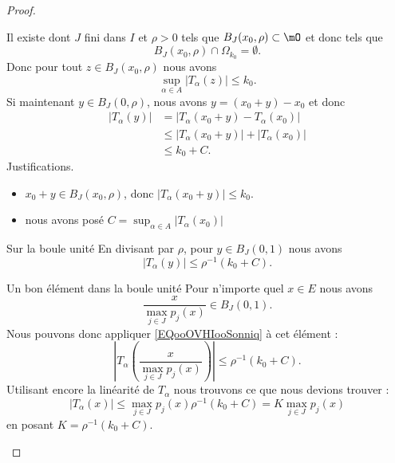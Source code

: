 \begin{proof}
\begin{subproof}
		Il existe dont \( J\) fini dans \( I\) et \( \rho>0\) tels que \( B_J(x_0,\rho)\subset \mO\) et donc tels que
		\begin{equation}
			B_J(x_0,\rho)\cap\Omega_{k_0}=\emptyset.
		\end{equation}
		Donc pour tout \( z\in B_J(x_0,\rho)\) nous avons
		\begin{equation}
			\sup_{\alpha\in A}\big| T_{\alpha}(z) \big|\leq k_0.
		\end{equation}
		Si maintenant \( y\in B_J(0,\rho)\), nous avons \( y=(x_0+y)-x_0\) et donc
		\begin{subequations}
			\begin{align}
				\big| T_{\alpha}(y) \big| & =\big| T_{\alpha}(x_0+y)-T_{\alpha}(x_0) \big|                 \\
				                          & \leq \big| T_{\alpha}(x_0+y) \big|+\big| T_{\alpha}(x_0) \big| \\
				                          & \leq k_0+C.
			\end{align}
		\end{subequations}
		Justifications.
		\begin{itemize}
			\item
			      \( x_0+y\in B_J(x_0,\rho)\), donc \( \big| T_{\alpha}(x_0+y) \big|\leq k_0\).
			\item
			      nous avons posé \( C=\sup_{\alpha\in A}\big| T_{\alpha}(x_0) \big|\)
		\end{itemize}
		\item[Sur la boule unité]
		En divisant par \( \rho\), pour \( y\in B_J(0,1)\) nous avons
		\begin{equation}        \label{EQooOVHIooSonniq}
			\big| T_{\alpha}(y) \big|\leq \rho^{-1}(k_0+C).
		\end{equation}
		\item[Un bon élément dans la boule unité]
		Pour n'importe quel \( x\in E\) nous avons
		\begin{equation}
			\frac{ x }{ \max_{j\in J}p_j(x) }\in B_J(0,1).
		\end{equation}
		Nous pouvons donc appliquer \eqref{EQooOVHIooSonniq} à cet élément :
		\begin{equation}
			\left| T_{\alpha}\left( \frac{ x }{ \max_{j\in J} p_j(x) } \right) \right| \leq \rho^{-1}(k_0+C).
		\end{equation}
		Utilisant encore la linéarité de \( T_{\alpha}\) nous trouvons ce que nous devions trouver :
		\begin{equation}
			\big| T_{\alpha}(x) \big|\leq \max_{j\in J}p_j(x)\rho^{-1}(k_0+C)=K\max_{j\in J}p_j(x)
		\end{equation}
		en posant \(K= \rho^{-1}(k_0+C)\).
	\end{subproof}
\end{proof}


